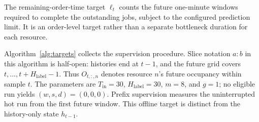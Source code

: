 The remaining-order-time target \(\ell_t\) counts the future one-minute windows required to complete the outstanding jobs, subject to the configured prediction limit. It is an order-level target rather than a separate bottleneck duration for each resource.

Algorithm~\ref{alg:targets} collects the supervision procedure. Slice notation \(a:b\) in this algorithm is half-open: histories end at \(t-1\), and the future grid covers \(t,\ldots,t+H_{\mathrm{label}}-1\). Thus \(O_{t,:,n}\) denotes resource \(n\)'s future occupancy within sample \(t\). The parameters are \(T_{\mathrm{in}}=30\), \(H_{\mathrm{label}}=30\), \(m=8\), and \(g=1\); no eligible run yields \((w,s,d)=(0,0,0)\). Prefix supervision measures the uninterrupted hot run from the first future window. This offline target is distinct from the history-only state \(h_{t-1}\).

